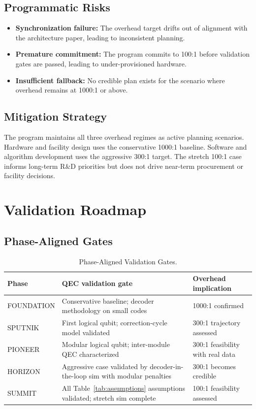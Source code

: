 \documentclass[conference]{IEEEtran}
\begin{document}
\subsection{Programmatic Risks}

\begin{itemize}
\item \textbf{Synchronization failure:} The overhead target drifts out of alignment with the architecture paper, leading to inconsistent planning.
\item \textbf{Premature commitment:} The program commits to 100:1 before validation gates are passed, leading to under-provisioned hardware.
\item \textbf{Insufficient fallback:} No credible plan exists for the scenario where overhead remains at 1000:1 or above.
\end{itemize}

\subsection{Mitigation Strategy}

The program maintains all three overhead regimes as active planning scenarios. Hardware and facility design uses the conservative 1000:1 baseline. Software and algorithm development uses the aggressive 300:1 target. The stretch 100:1 case informs long-term R\&D priorities but does not drive near-term procurement or facility decisions.

\section{Validation Roadmap}

\subsection{Phase-Aligned Gates}

\begin{table}[htbp]
\centering
\caption{Phase-Aligned Validation Gates.}
\label{tab:phase_gates}
\begin{tabular}{lp{3cm}p{2.5cm}}
\toprule
\textbf{Phase} & \textbf{QEC validation gate} & \textbf{Overhead implication} \\
\midrule
FOUNDATION & Conservative baseline; decoder methodology on small codes & 1000:1 confirmed \\
SPUTNIK & First logical qubit; correction-cycle model validated & 300:1 trajectory assessed \\
PIONEER & Modular logical qubit; inter-module QEC characterized & 300:1 feasibility with real data \\
HORIZON & Aggressive case validated by decoder-in-the-loop sim with modular penalties & 300:1 becomes credible \\
SUMMIT & All Table~\ref{tab:assumptions} assumptions validated; stretch sim complete & 100:1 feasibility assessed \\
\bottomrule
\end{tabular}
\end{table}
\end{document}
